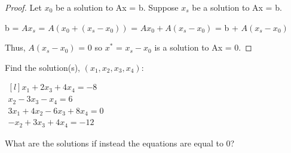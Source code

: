     \begin{proof}
        Let $x_0$ be a solution to Ax = b. Suppose $x_s$ be a solution to Ax = b.

        \hspace{0.5cm}
        b = $Ax_s$
        = $A(x_0 + (x_s - x_0))$
        = $Ax_0 + A(x_s - x_0)$
        = b + $A(x_s - x_0)$
        
        Thus, $A(x_s - x_0)$ = 0
        so $x^*$ = $x_s - x_0$ is a solution to Ax = 0.
    \end{proof}

    \newpage



    



    \begin{example}
        Find the solution(s), $(x_1,x_2,x_3,x_4)$:

        \hspace{0.5cm}
        $\begin{matrix*}[l]
            x_1 + 2x_3 + 4x_4 = -8 \\
            x_2 - 3x_3 - x_4 = 6 \\
            3x_1 + 4x_2 - 6x_3 + 8x_4 = 0 \\
            -x_2 + 3x_3 + 4x_4 = - 12
        \end{matrix*}$

        What are the solutions if instead the equations are equal to 0?
    \end{example}

